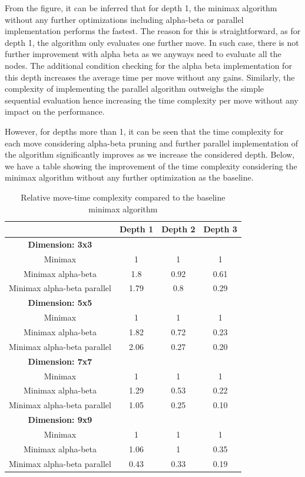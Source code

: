 From the figure, it can be inferred that for depth 1, the minimax algorithm without any further optimizations including alpha-beta or parallel implementation performs the fastest. The reason for this is straightforward, as for depth 1, the algorithm only evaluates one further move. In such case, there is not further improvement with alpha beta as we anyways need to evaluate all the nodes. The additional condition checking for the alpha beta implementation for this depth increases the average time per move without any gains. Similarly, the complexity of implementing the parallel algorithm outweighs the simple sequential evaluation hence increasing the time complexity per move without any impact on the performance.

However, for depths more than 1, it can be seen that the time complexity for each move considering alpha-beta pruning and further parallel implementation of the algorithm significantly improves as we increase the considered depth. Below, we have a table showing the improvement of the time complexity considering the minimax algorithm without any further optimization as the baseline.

\begin{table}[!ht]
    \centering
     \begin{tabular}{|c|c|c|c|}\hline
          & Depth 1 & Depth 2 & Depth 3\\ \hline 
          \textbf{Dimension: 3x3}  &    &    &     \\ \hline
          Minimax  &  1  &   1 &   1  \\ \hline
          Minimax alpha-beta &  1.8 &  0.92 &  0.61 \\ \hline
          Minimax alpha-beta parallel & 1.79 & 0.8& 0.29  \\ \hline
          \textbf{Dimension: 5x5}  &    &    &     \\ \hline
          Minimax  &  1  &   1 &   1  \\ \hline
          Minimax alpha-beta &  1.82 &  0.72 &  0.23 \\ \hline
          Minimax alpha-beta parallel & 2.06 & 0.27 & 0.20  \\ \hline
          \textbf{Dimension: 7x7}  &    &    &     \\ \hline
          Minimax  &  1  &   1 &   1  \\ \hline
          Minimax alpha-beta &  1.29 &  0.53 &  0.22 \\ \hline
          Minimax alpha-beta parallel & 1.05 & 0.25 & 0.10 \\ \hline
          \textbf{Dimension: 9x9} &    &    &     \\ \hline
          Minimax  &  1  &   1 &   1  \\ \hline
          Minimax alpha-beta &  1.06 &  1 &  0.35 \\ \hline
          Minimax alpha-beta parallel & 0.43 & 0.33 & 0.19  \\ \hline
     \end{tabular}
     \caption{Relative move-time complexity compared to the baseline minimax algorithm}
     \label{tab:complexity}
 \end{table}

